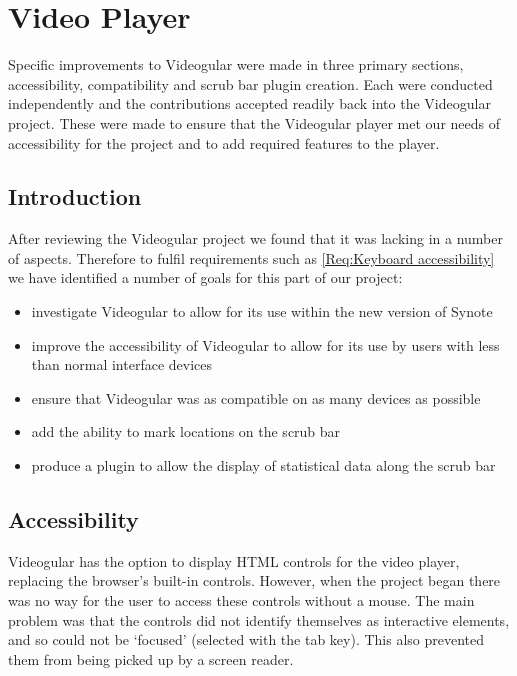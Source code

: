 
\chapter{Video Player}
\label{Chapter:Video Player}

\begin{preamble}
Specific improvements to \gls{Videogular} were made in three primary sections, accessibility, compatibility and scrub bar plugin creation. Each were conducted independently and the contributions accepted readily back into the \gls{Videogular} project. These were made to ensure that the \gls{Videogular} player met our needs of accessibility for the project and to add required features to the player.
\end{preamble}

\section{Introduction}

After reviewing the \gls{Videogular} project we found that it was lacking in a number of aspects. Therefore to fulfil requirements such as \cref{Req:Keyboard accessibility} we have identified a number of goals for this part of our project:

\begin{itemize}
\item investigate \gls{Videogular} to allow for its use within the new version of Synote
\item improve the accessibility of \gls{Videogular} to allow for its use by users with less than normal interface  devices
\item ensure that \gls{Videogular} was as compatible on as many devices as possible
\item add the ability to mark locations on the scrub bar
\item produce a plugin to allow the display of statistical data along the scrub bar
\end{itemize}

\section{Accessibility}
\label{Section:Accessibility}
\gls{Videogular} has the option to display HTML controls for the video player, replacing the browser's built-in controls. However, when the project began there was no way for the user to access these controls without a mouse. The main problem was that the controls did not identify themselves as interactive elements, and so could not be `focused' (selected with the tab key). This also prevented them from being picked up by a screen reader.

